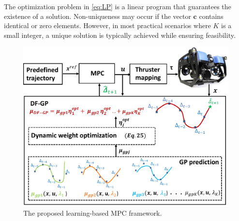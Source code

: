 

\begin{remark}
The optimization problem in \eqref{eq:LP} is a linear program that guarantees the existence of a solution. Non-uniqueness may occur if the vector $\mathbf{c}$ contains identical or zero elements. However, in most practical scenarios where $K$ is a small integer, a unique solution is typically achieved while ensuring feasibility.
\end{remark}









\begin{figure}[t]
	\centering	\includegraphics[width=0.\linewidth]{figures/new_abstract.pdf}
	\caption{ The proposed learning-based \ac{MPC} framework. }

 
	\label{fig:abstract}
\end{figure}








